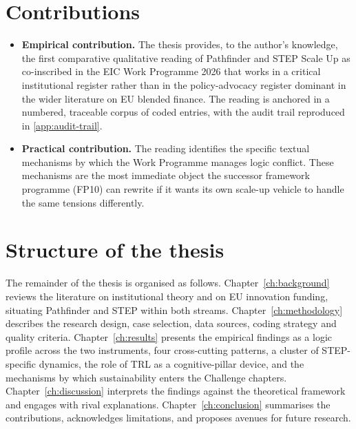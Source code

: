 \section{Contributions}
\label{sec:intro-contribution}
\begin{itemize}
    \item \textbf{Empirical contribution.} The thesis provides, to the
          author's knowledge, the first comparative qualitative reading
          of Pathfinder and STEP Scale Up as co-inscribed in the EIC
          Work Programme 2026 that works in a critical institutional
          register rather than in the policy-advocacy register dominant
          in the wider literature on EU blended finance. The reading is
          anchored in a numbered, traceable corpus of coded entries,
          with the audit trail reproduced in \cref{app:audit-trail}.
    \item \textbf{Practical contribution.} The reading identifies the
          specific textual mechanisms by which the Work Programme
          manages logic conflict. These mechanisms are the most
          immediate object the successor framework programme (FP10) can
          rewrite if it wants its own scale-up vehicle to handle the
          same tensions differently.
\end{itemize}

\section{Structure of the thesis}
\label{sec:intro-structure}
The remainder of the thesis is organised as follows.
Chapter~\ref{ch:background} reviews the literature on institutional theory
and on EU innovation funding, situating Pathfinder and STEP within both
streams.
Chapter~\ref{ch:methodology} describes the research design, case selection,
data sources, coding strategy and quality criteria.
Chapter~\ref{ch:results} presents the empirical findings as a logic
profile across the two instruments, four cross-cutting patterns, a
cluster of STEP-specific dynamics, the role of TRL as a
cognitive-pillar device, and the mechanisms by which sustainability
enters the Challenge chapters.
Chapter~\ref{ch:discussion} interprets the findings against the theoretical
framework and engages with rival explanations.
Chapter~\ref{ch:conclusion} summarises the contributions, acknowledges
limitations, and proposes avenues for future research.
